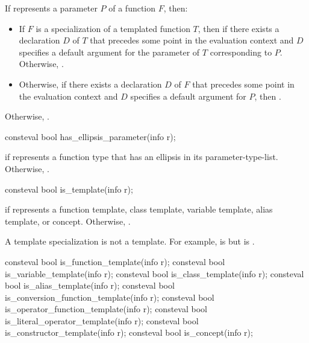 \begin{itemdescr}
\pnum
\returns
If  represents a parameter $P$ of a function $F$, then:
\begin{itemize}
\item
  If $F$ is a specialization of a templated function $T$,
  then  if there exists a declaration $D$ of $T$
  that precedes some point in the evaluation context
  and $D$ specifies a default argument
  for the parameter of $T$ corresponding to $P$.
  Otherwise, .
\item
  Otherwise, if there exists a declaration $D$ of $F$
  that precedes some point in the evaluation context
  and $D$ specifies a default argument for $P$,
  then .
\end{itemize}
Otherwise, .
\end{itemdescr}

%
\begin{itemdecl}
consteval bool has_ellipsis_parameter(info r);
\end{itemdecl}

\begin{itemdescr}
\pnum
\returns
{} if  represents a function type
that has an ellipsis in its parameter-type-list.
Otherwise, .
\end{itemdescr}

%
\begin{itemdecl}
consteval bool is_template(info r);
\end{itemdecl}

\begin{itemdescr}
\pnum
\returns
{} if  represents a
function template,
class template,
variable template,
alias template, or
concept.
Otherwise, .

\pnum
\begin{note}
A template specialization is not a template.
For example,
 is 
but  is .
\end{note}
\end{itemdescr}

%
%
%
%
%
%
%
%
%
\begin{itemdecl}
consteval bool is_function_template(info r);
consteval bool is_variable_template(info r);
consteval bool is_class_template(info r);
consteval bool is_alias_template(info r);
consteval bool is_conversion_function_template(info r);
consteval bool is_operator_function_template(info r);
consteval bool is_literal_operator_template(info r);
consteval bool is_constructor_template(info r);
consteval bool is_concept(info r);
\end{itemdecl}


